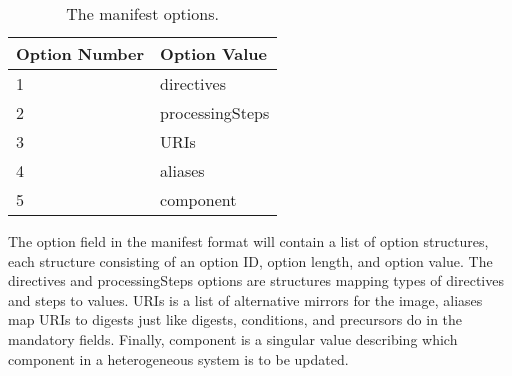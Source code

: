 \documentclass[0-thesis.tex]{subfiles}
\begin{document}
\begin{longtable}[]{@{}ll@{}}
    \caption{The manifest options.}
    \label{tab:option-codes}\\
    \toprule
    Option Number & Option Value\tabularnewline
    \midrule
    \endhead
    1 & directives\tabularnewline
    2 & processingSteps\tabularnewline
    3 & URIs\tabularnewline
    4 & aliases\tabularnewline
    5 & component\tabularnewline
    \bottomrule
\end{longtable}

The option field in the manifest format will contain a list of option structures, each
structure consisting of an option ID, option length, and option value. The directives and
processingSteps options are structures mapping types of directives and steps to values.
URIs is a list of alternative mirrors for the image, aliases map URIs to digests just like
digests, conditions, and precursors do in the mandatory fields. Finally, component is a
singular value describing which component in a heterogeneous system is to be updated.
\end{document}
